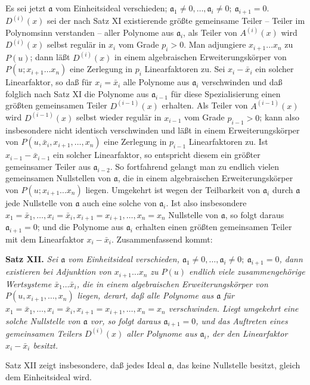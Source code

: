 \documentclass[11pt]{article}
\providecommand{\aideal}{\mathfrak a}
\begin{document}
Es sei jetzt $\aideal$ vom Einheitsideal verschieden; $\aideal_1\ne0,\ldots,\aideal_i\ne0;\ \aideal_{i+1}=0$. $D^{(i)}(x)$ sei der nach Satz XI existierende größte gemeinsame Teiler -- Teiler im Polynomsinn verstanden -- aller Polynome aus $\aideal_i$, als Teiler von $A^{(i)}(x)$ wird $D^{(i)}(x)$ selbst regulär in $x_i$ vom Grade $p_i>0$. Man adjungiere $x_{i+1}\ldots x_n$ zu $P(u)$; dann läßt $D^{(i)}(x)$ in einem algebraischen Erweiterungskörper von $P(u;x_{i+1}\ldots x_n)$ eine Zerlegung in $p_i$ Linearfaktoren zu. Sei $x_i-\bar x_i$ ein solcher Linearfaktor, so daß für $x_i=\bar x_i$ alle Polynome aus $\aideal_i$ verschwinden und daß folglich nach Satz XI die Polynome aus $\aideal_{i-1}$ für diese Spezialisierung einen größten gemeinsamen Teiler $D^{(i-1)}(x)$ erhalten. Als Teiler von $A^{(i-1)}(x)$ wird $D^{(i-1)}(x)$ selbst wieder regulär in $x_{i-1}$ vom Grade $p_{i-1}>0$; kann also insbesondere nicht identisch verschwinden und läßt in einem Erweiterungskörper von $P(u,\bar x_i,x_{i+1},\ldots,x_n)$ eine Zerlegung in $p_{i-1}$ Linearfaktoren zu. Ist $x_{i-1}-\bar x_{i-1}$ ein solcher Linearfaktor, so entspricht diesem ein größter gemeinsamer Teiler aus $\aideal_{i-2}$. So fortfahrend gelangt man zu endlich vielen gemeinsamen Nullstellen von $\aideal$, die in einem algebraischen Erweiterungskörper von $P(u;x_{i+1}\ldots x_n)$ liegen. Umgekehrt ist wegen der Teilbarkeit von $\aideal_i$ durch $\aideal$ jede Nullstelle von $\aideal$ auch eine solche von $\aideal_i$. Ist also insbesondere $x_1=\bar x_1,\ldots,x_i=\bar x_i,x_{i+1}=x_{i+1},\ldots,x_n=x_n$ Nullstelle von $\aideal$, so folgt daraus $\aideal_{i+1}=0$; und die Polynome aus $\aideal_i$ erhalten einen größten gemeinsamen Teiler mit dem Linearfaktor $x_i-\bar x_i$. Zusammenfassend kommt:

\medskip
\noindent\textbf{Satz XII.} \emph{Sei $\aideal$ vom Einheitsideal verschieden, $\aideal_1\ne0,\ldots,\aideal_i\ne0;\ \aideal_{i+1}=0$, dann existieren bei Adjunktion von $x_{i+1}\ldots x_n$ zu $P(u)$ endlich viele zusammengehörige Wertsysteme $\bar x_1\ldots\bar x_i$, die in einem algebraischen Erweiterungskörper von $P(u,x_{i+1},\ldots,x_n)$ liegen, derart, daß alle Polynome aus $\aideal$ für $x_1=\bar x_1,\ldots,x_i=\bar x_i,x_{i+1}=x_{i+1},\ldots,x_n=x_n$ verschwinden. Liegt umgekehrt eine solche Nullstelle von $\aideal$ vor, so folgt daraus $\aideal_{i+1}=0$, und das Auftreten eines gemeinsamen Teilers $D^{(i)}(x)$ aller Polynome aus $\aideal_i$, der den Linearfaktor $x_i-\bar x_i$ besitzt.}

Satz XII zeigt insbesondere, daß jedes Ideal $\aideal$, das keine Nullstelle besitzt, gleich dem Einheitsideal wird.
\end{document}
